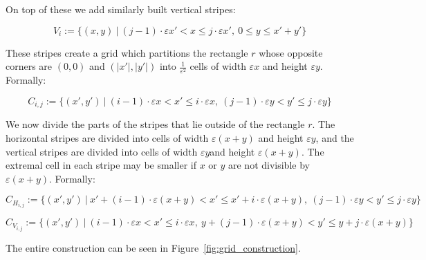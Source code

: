 \documentclass{article}
\newcommand{\eps}{\varepsilon}
\begin{document}
	On top of these we add similarly built vertical stripes:
	
	$$V_{i}:=\{(x,y)~|~ (j-1)\cdot \eps x' < x \leq j\cdot \eps x',~ 0 \leq y \leq x'+y' \}$$
	
	These stripes create a grid which partitions the rectangle $r$ whose opposite corners are $(0,0)$ and $(|x'|,|y'|)$ into $\frac{1}{\eps^2}$ cells of width $\eps x$ and height $\eps y$. Formally:
	
	$$C_{i,j}:=\{(x',y')~|~  (i-1)\cdot \eps x < x' \leq i\cdot \eps x,~ (j-1)\cdot \eps y< y' \leq j\cdot \eps y\}$$
	
	We now divide the parts of the stripes that lie outside of the rectangle $r$. The horizontal stripes are divided into cells of width $\eps(x+y)$ and height $\eps y$, and the vertical stripes are divided into cells of width $\eps y$and height $\eps(x+y)$. The extremal cell in each stripe may be smaller if $x$ or $y$ are not divisible by $\eps(x+y)$. Formally:
	
	$$C_{H_{i,j}}:=\{(x',y')~|~  x' + (i-1)\cdot \eps (x+y) < x' \leq x' + i\cdot \eps (x+y),~ (j-1)\cdot \eps y< y' \leq j\cdot \eps y\}$$
	
	$$C_{V_{i,j}}:=\{(x',y')~|~  (i-1)\cdot \eps x < x' \leq i\cdot \eps x,~ y + (j-1)\cdot \eps (x+y)< y' \leq y + j\cdot \eps (x+y)\}$$
	
	The entire construction can be seen in Figure~\ref{fig:grid_construction}.
	
\end{document}
